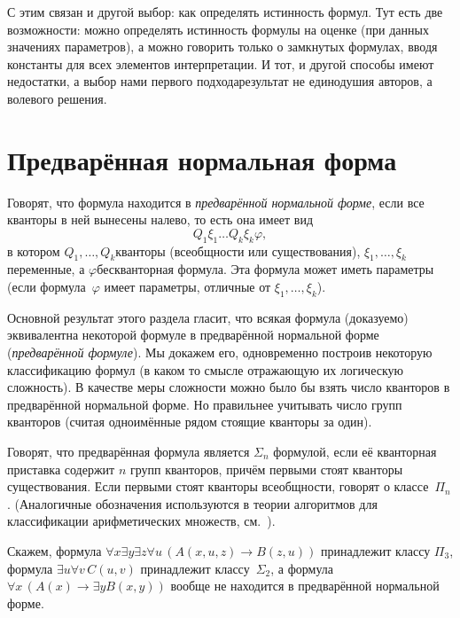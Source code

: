 С этим связан и другой выбор: как определять истинность формул.
Тут есть две возможности: можно определять истинность формулы на
оценке (при данных значениях параметров), а можно говорить
только о замкнутых формулах, вводя константы для всех элементов
интерпретации. И тот, и другой способы имеют недостатки, а выбор
нами первого подхода\т результат не единодушия авторов, а
волевого решения.

\section{Предварённая нормальная форма}
        \label{prenex-normal-form}%

Говорят, что формула находится в \emph{предварённой нормальной
форме},%
%
если все кванторы в ней вынесены налево, то есть 
она имеет вид
        $$
Q_1 \xi_1 \ldots Q_k \xi_k \varphi,
        $$
в котором $Q_1,\dots,Q_k$\т кванторы (всеобщности или существования),
$\xi_1,\dots,\xi_k$\т переменные, а $\varphi$\т бескванторная
формула. Эта формула может иметь параметры (если
формула~$\varphi$ имеет параметры, отличные от
$\xi_1,\dots,\xi_k$).

Основной результат этого раздела гласит, что всякая формула
(доказуемо) эквивалентна некоторой формуле в предварённой
нормальной форме (\emph{предварённой формуле}).%
%
Мы докажем его,
одновременно построив некоторую классификацию формул (в каком\д
то смысле отражающую их  логическую сложность). В качестве
меры сложности можно было бы взять число кванторов в
предварённой нормальной форме. Но правильнее учитывать число
групп кванторов (считая одноимённые рядом стоящие кванторы за
один).

Говорят, что предварённая формула является $\Sigma_n$\д
формулой, если её кванторная приставка содержит $n$ групп
кванторов, причём первыми стоят кванторы существования. Если
первыми стоят кванторы всеобщности, говорят о классе~$\Pi_n$.
(Аналогичные обозначения используются в теории алгоритмов для
классификации арифметических множеств,
см.~\cite{computable-functions}).

Скажем, формула ${\forall x \exists y \exists z\forall u\,
(A(x,u,z)\to B(z,u))}$ принадлежит классу $\Pi_3$, формула
$\exists u\forall v\,C(u,v)$ принадлежит классу~$\Sigma_2$, а
формула ${\forall x\, (A(x) \to \exists y B(x,y))}$ вообще не
находится в предварённой нормальной форме.

